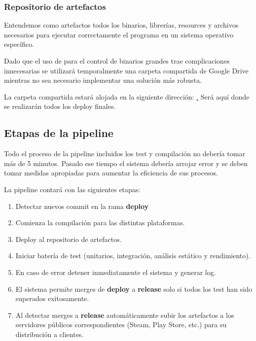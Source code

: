 \subsubsection{Repositorio de artefactos}

Entendemos como artefactos todos los binarios, librerías, resources y archivos necesarios para ejecutar correctamente el programa en un sistema operativo específico.

Dado que el uso de  para el control de binarios grandes trae complicaciones innecesarias se utilizará temporalmente una carpeta compartida de Google Drive mientras no sea necesario implementar una solución más robusta.

La carpeta compartida estará alojada en la siguiente dirección: \href{https://drive.google.com/drive/folders/15OtN9fs-UASOKTRcWGbR-knWMSmQGyO_?usp=sharing}. Será aquí donde se realizarán todos los deploy finales.

\subsection{Etapas de la pipeline}

Todo el proceso de la pipeline incluidos los test y compilación no debería tomar más de 5 minutos. Pasado ese tiempo el sistema debería arrojar error y se deben tomar medidas apropiadas para aumentar la eficiencia de sus procesos.

La pipeline contará con las siguientes etapas:

\begin{enumerate}
    \item Detectar nuevos commit en la rama \textbf{deploy}
    \item Comienza la compilación para las distintas plataformas.
    \item Deploy al repositorio de artefactos.
    \item Iniciar batería de test (unitarios, integración, análisis estático y rendimiento).
    \item En caso de error detener inmediatamente el sistema y generar log.
    \item El sistema permite merges de \textbf{deploy} a \textbf{release} solo si todos los test han sido superados exitosamente.
    \item Al detectar merges a \textbf{release} automáticamente subir los artefactos a los servidores públicos correspondientes (Steam, Play Store, etc.) para su distribución a clientes.
\end{enumerate}

